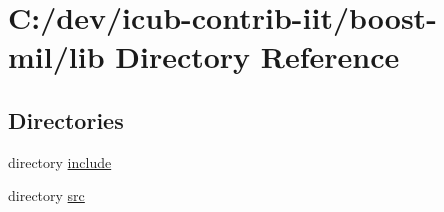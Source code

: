 \section{C\+:/dev/icub-\/contrib-\/iit/boost-\/mil/lib Directory Reference}
\label{dir_97aefd0d527b934f1d99a682da8fe6a9}
\subsection*{Directories}
\begin{DoxyCompactItemize}
\item 
directory \hyperlink{dir_5a30104352ef4255dc24354b02eb2d20}{include}
\item 
directory \hyperlink{dir_a065c5f60305fee3569f887679366939}{src}
\end{DoxyCompactItemize}
